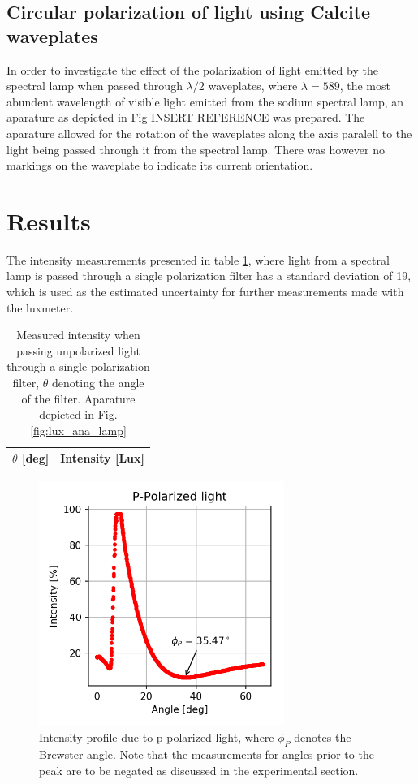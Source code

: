 \documentclass[11pt,a4paper,twocolumn]{article}
\begin{document}
  \subsection{Circular polarization of light using Calcite waveplates}
    In order to investigate the effect of the polarization of light emitted by the spectral lamp when passed through $\lambda /2$ waveplates, where $\lambda=589$, the most abundent wavelength of visible light emitted from the sodium spectral lamp, an aparature as depicted in Fig INSERT REFERENCE was prepared. The aparature allowed for the rotation of the waveplates along the axis paralell to the light being passed through it from the spectral lamp. There was however no markings on the waveplate to indicate its current orientation.

    


\section{\label{sect:results}Results}
  
  The intensity measurements presented in table \ref{tab:ana}, where light from a spectral lamp is passed through a single polarization filter has a standard deviation of 19, which is used as the estimated uncertainty for further measurements made with the luxmeter.


  \begin{table}[H]
      \center
      \caption{Measured intensity when passing unpolarized light through a single polarization filter, $\theta$ denoting the angle of the filter. Aparature depicted in Fig. \ref{fig:lux_ana_lamp}}
       \begin{tabular}{r | l}
        $\theta$ [deg] & Intensity [Lux] \\ \hline
         
       \end{tabular}
       \label{tab:ana}
  \end{table}



  \begin{figure}[H]
    \center
    \includegraphics[width=8cm]{scripts/ppolar.png}
    \caption{Intensity profile due to p-polarized light, where $\phi_P$ denotes the Brewster angle. Note that the measurements for angles prior to the peak are to be negated as discussed in the experimental section.}
  \end{figure}
\end{document}

